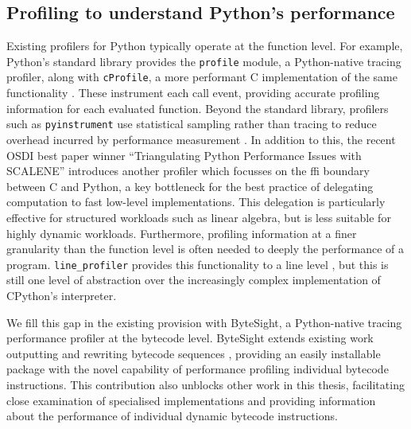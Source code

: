 \subsection{Profiling to understand Python's performance}
\label{sec:python-performance-profiling}

Existing profilers for Python typically operate at the function level.
For example, Python's standard library provides the \texttt{profile} module, a Python-native tracing profiler, along with \texttt{cProfile}, a more performant C implementation of the same functionality \cite{pythonsoftwarefoundationPythonProfilers}. These instrument each call event, providing accurate profiling information for each evaluated function.
Beyond the standard library, profilers such as \texttt{pyinstrument} use statistical sampling rather than tracing to reduce overhead incurred by performance measurement \cite{rickerbyPyinstrument2025}.
In addition to this, the recent OSDI best paper winner ``Triangulating Python Performance Issues with SCALENE'' \cite{bergerTriangulatingPythonPerformance2023a} introduces another profiler which focusses on the \ac{ffi} boundary between C and Python, a key bottleneck for the best practice of delegating computation to fast low-level implementations.
This delegation is particularly effective for structured workloads such as linear algebra, but is less suitable for highly dynamic workloads.
Furthermore, profiling information at a finer granularity than the function level is often needed to deeply the performance of a program.
\texttt{line\_profiler} provides this functionality to a line level \cite{robertkernPyutilsLine_profiler2025}, but this is still one level of abstraction over the increasingly complex implementation of CPython's interpreter.

We fill this gap in the existing provision with ByteSight, a Python-native tracing performance profiler at the bytecode level.
ByteSight extends existing work outputting and rewriting bytecode sequences \cite{0xecCodingReversingHacking2017} \cite{clementrouaultUnderstandingPythonExecution} \cite{nedbatchelderWickedHackPython2008}, providing an easily installable package with the novel capability of performance profiling individual bytecode instructions.
This contribution also unblocks other work in this thesis, facilitating close examination of specialised implementations and providing information about the performance of individual dynamic bytecode instructions.



